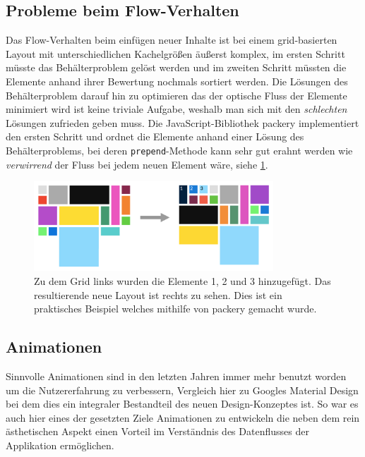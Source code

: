 \documentclass[12pt,twoside]{book}
\begin{document}
\begin{itemize}
  \subsection{Probleme beim Flow-Verhalten}
  Das Flow-Verhalten beim einfügen neuer Inhalte ist bei einem grid-basierten Layout mit unterschiedlichen Kachelgrößen äußerst komplex, im ersten Schritt müsste das Behälterproblem gelöst werden und im zweiten Schritt müssten die Elemente anhand ihrer Bewertung nochmals sortiert werden. Die Lösungen des Behälterproblem darauf hin zu optimieren das der optische Fluss der Elemente minimiert wird ist keine triviale Aufgabe, weshalb man sich mit den \textit{schlechten} Lösungen zufrieden geben muss. Die JavaScript-Bibliothek packery\cite{packery} implementiert den ersten Schritt und ordnet die Elemente anhand einer Lösung des Behälterproblems, bei deren \texttt{prepend}-Methode kann sehr gut erahnt werden wie \textit{verwirrend} der Fluss bei jedem neuen Element wäre, siehe \ref{fig:grid_flow}.

  \begin{figure}[H]
    \centering
    \includegraphics[width=0.8\textwidth]{images/grid_flow.png}
    \caption{Zu dem Grid links wurden die Elemente 1, 2 und 3 hinzugefügt. Das resultierende neue Layout ist rechts zu sehen. Dies ist ein praktisches Beispiel welches mithilfe von packery gemacht wurde.}
    \label{fig:grid_flow}
  \end{figure}


\end{itemize}

\subsection{Animationen}

Sinnvolle Animationen sind in den letzten Jahren immer mehr benutzt worden um die Nutzererfahrung zu verbessern, Vergleich hier zu Googles Material Design bei dem dies ein integraler Bestandteil des neuen Design-Konzeptes ist.
So war es auch hier eines der gesetzten Ziele Animationen zu entwickeln die neben dem rein ästhetischen Aspekt einen Vorteil im Verständnis des Datenflusses der Applikation ermöglichen.
\end{document}
